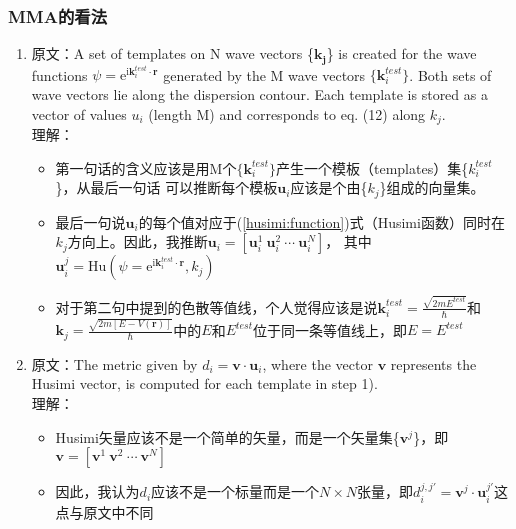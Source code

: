 \documentclass[UTF8]{beamer}
\begin{document}
\begin{frame}[allowframebreaks]
    \frametitle{\textbf{MMA}的看法}
    \begin{enumerate}
%
    \item 原文：A set of \textcolor{blue!90}{templates} on N wave vectors \{$\mathbf{k_j}$\} is 
                    created for the wave functions $\psi=\mathrm{e}^{\mathrm{i}\mathbf{k}_{i}^{test}\cdot\mathbf{r}}$ 
                    generated by the M wave vectors $\{\mathbf{k}_{i}^{test}\}$. Both sets of wave vectors lie along the 
                    dispersion contour. Each \textcolor{blue!90}{template} is stored as a vector of values $u_i$ (length M) 
                    and corresponds to eq. (12) along $k_j$.\\
          理解：
        \begin{itemize}
        \item 第一句话的含义应该是用M个$\{\mathbf{k}_{i}^{test}\}$产生一个模板（templates）集\{$k_{i}^{test}$\}，从最后一句话
            可以推断每个模板$\mathbf{u}_i$应该是个由\{$k_j$\}组成的向量集。
        \item 最后一句说$\mathbf{u}_i$的每个值对应于(\ref{husimi:function})式（Husimi函数）同时在$k_j$方向上。因此，我推断$\mathbf{u}_i = [ \mathbf{u}_i^{1}\ \mathbf{u}_i^{2}\ \cdots\ \mathbf{u}_i^{N}]$，
            其中$\mathbf{u}_i^{j}=\mathrm{Hu}(\psi=\mathrm{e}^{\mathrm{i}\mathbf{k}_{i}^{test}\cdot\mathbf{r}},k_j)$
        \item 对于第二句中提到的色散等值线，个人觉得应该是说$\mathbf{k}_{i}^{test}=\frac{\sqrt{2mE^{test}}}{\hbar}$和
                $\mathbf{k}_{j}=\frac{\sqrt{2m[E-V(\mathbf{r})]}}{\hbar}$中的$E$和$E^{test}$位于同一条等值线上，即$E=E^{test}$
        \end{itemize}
%
    \item 原文：The metric given by $d_i=\mathbf{v}\cdot\mathbf{u}_i$, where the vector $\mathbf{v}$ represents the \textcolor{red!80}{Husimi vector}, is computed for
                        each \textcolor{blue!90}{template} in step 1).\\
          理解：
            \begin{itemize}
                \item Husimi矢量应该不是一个简单的矢量，而是一个矢量集\{$\mathbf{v}^{j}$\}，即$\mathbf{v}=[\mathbf{v}^1\ \mathbf{v}^2\ \cdots\ \mathbf{v}^N]$
                \item 因此，我认为$d_i$应该不是一个标量而是一个$N\times N$张量，即$d_i^{j,j'}=\mathbf{v}^{j}\cdot\mathbf{u}_{i}^{j'}$\colorbox{red!60}{这点与原文中不同}

\end{itemize}
\end{enumerate}
\end{frame}
\end{document}
